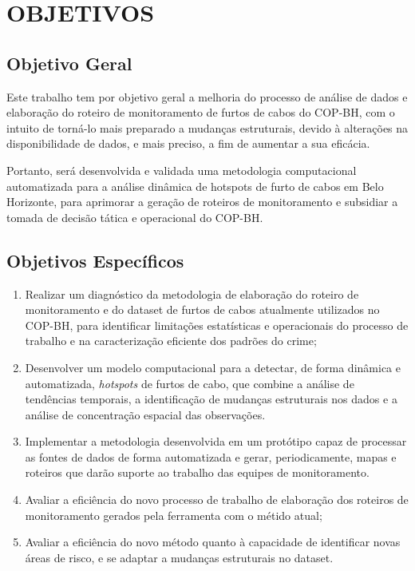 \section{OBJETIVOS}
\label{sec:objetivos}

\subsection{Objetivo Geral}
\label{subsec:objgeral}
Este trabalho tem por objetivo geral a melhoria do processo de análise de dados e elaboração do roteiro de monitoramento de furtos de cabos do COP-BH, com o intuito de torná-lo mais preparado a mudanças estruturais, devido à alterações na disponibilidade de dados, e mais preciso, a fim de aumentar a sua eficácia.

Portanto, será desenvolvida e validada uma metodologia computacional automatizada para a análise dinâmica de hotspots de furto de cabos em Belo Horizonte, para aprimorar a geração de roteiros de monitoramento e subsidiar a tomada de decisão tática e operacional do COP-BH.

\subsection{Objetivos Específicos}
\label{subsec:objespc}
\begin{enumerate}
  \item{Realizar um diagnóstico da metodologia de elaboração do roteiro de monitoramento e do dataset de furtos de cabos atualmente utilizados no COP-BH, para identificar limitações estatísticas e operacionais do processo de trabalho e na caracterização eficiente dos padrões do crime;}
  \item{Desenvolver um modelo computacional para a detectar, de forma dinâmica e automatizada, \textit{hotspots} de furtos de cabo, que combine a análise de tendências temporais, a identificação de mudanças estruturais nos dados e a análise de concentração espacial das observações.}
  \item{Implementar a metodologia desenvolvida em um protótipo capaz de processar as fontes de dados de forma automatizada e gerar, periodicamente, mapas e roteiros que darão suporte ao trabalho das equipes de monitoramento.}
  \item{Avaliar a eficiência do novo processo de trabalho de elaboração dos roteiros de monitoramento gerados pela ferramenta com o métido atual;}
  \item{Avaliar a eficiência do novo método quanto à capacidade de identificar novas áreas de risco, e se adaptar a mudanças estruturais no dataset.}
\end{enumerate}

